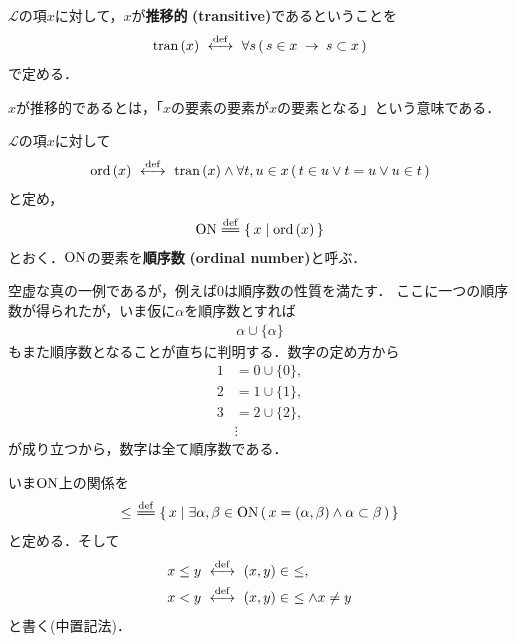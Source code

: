 	\begin{screen}
		\begin{dfn}[推移的類]
			$\mathcal{L}$の項$x$に対して，$x$が{\bf 推移的}
			{\bf (transitive)}であるということを
			\begin{align}
				\operatorname*{tran}\hspace{0.15em}(x) \ \overset{\mathrm{def}}{\longleftrightarrow}\ 
				\forall s\, (\, s \in x \hspace{0.25em}\rightarrow\hspace{0.25em} s \subset x\, )
			\end{align}
			で定める．
		\end{dfn}
	\end{screen}
	
	$x$が推移的であるとは，「$x$の要素の要素が$x$の要素となる」という意味である．
	
	\begin{screen}
		\begin{dfn}[順序数]
			$\mathcal{L}$の項$x$に対して
			\begin{align}
				\operatorname*{ord}\hspace{0.15em}(x) \ \overset{\mathrm{def}}{\longleftrightarrow}\  \operatorname*{tran}\hspace{0.15em}(x) \wedge 
				\forall t,u \in x\, (\, t \in u \vee t = u \vee u \in t\, )
			\end{align}
			と定め，
			\begin{align}
				\ON \defeq \Set{x}{\ord{x}}
			\end{align}
			とおく．$\mathrm{ON}$の要素を{\bf 順序数}\index{じゅんじょすう@順序数}
			{\bf (ordinal number)}と呼ぶ．
		\end{dfn}
	\end{screen}
	
	空虚な真の一例であるが，例えば$0$は順序数の性質を満たす．
	ここに一つの順序数が得られたが，いま仮に$\alpha$を順序数とすれば
	\begin{align}
		\alpha \cup \{\alpha\}
	\end{align}
	もまた順序数となることが直ちに判明する．数字の定め方から
	\begin{align}
		1 &= 0 \cup \{0\}, \\
		2 &= 1 \cup \{1\}, \\
		3 &= 2 \cup \{2\}, \\
		&\vdots
	\end{align}
	が成り立つから，数字は全て順序数である．
	
	いま$\mathrm{ON}$上の関係を
	\begin{align}
		\leq\ \defeq \Set{x}{\exists \alpha,\beta \in \ON\, 
		(\, x=(\alpha,\beta) \wedge \alpha \subset \beta\, )}
	\end{align}
	と定める．そして
	\begin{align}
		x \leq y &\ \overset{\mathrm{def}}{\longleftrightarrow}\  (x,y) \in\ \leq, \\
		x < y &\ \overset{\mathrm{def}}{\longleftrightarrow}\  (x,y) \in\ \leq \wedge x \neq y
	\end{align}
	と書く(中置記法)．
	
